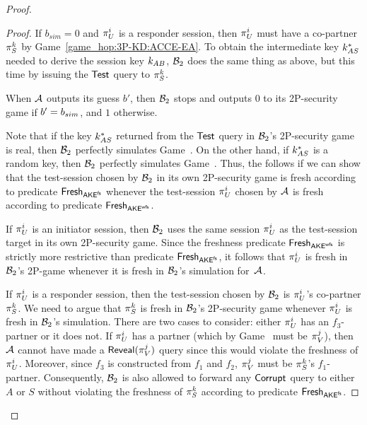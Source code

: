 \begin{proof}
\begin{proof}
If $b_{sim} = 0$ and $\oracle[U][i]$ is a responder session,
then $\oracle[U][i]$ must have a co-partner $\oracle[S][k]$ by Game~\ref{game_hop:3P-KD:ACCE-EA}.
To obtain the intermediate key $\key_{AS}^*$ needed to derive the session key $\key_{AB}$, 
$\A[B]_2$ does the same thing as above,
but this time by issuing the $\Test$ query to $\oracle[S][k]$.



When $\A$ outputs its guess $b'$,
then $\A[B]_2$ stops and outputs $0$ to its 2P-\akefstext security game if $b' = \bsim$,
and $1$ otherwise.
\medskip

Note that if the key $\key_{AS}^*$ returned from the $\Test$ query in $\A[B]_2$'s 2P-\akefstext security game is real, 
then $\A[B]_2$ perfectly simulates Game~\prevgame{}.
On the other hand,
if $\key_{AS}^*$ is a random key,
then $\A[B]_2$ perfectly simulates Game~\game{}.
Thus, the  follows if we can show that the test-session chosen by $\A[B]_2$ in its own 2P-\akefstext security game is fresh according to predicate $\fresh_{\akefs}$ whenever the test-session $\oracle[U][i]$ chosen by $\A$ is fresh according to predicate $\fresh_{\akewfs}$.

If $\oracle[U][i]$ is an initiator session,
then $\A[B]_2$  uses the same session $\oracle[U][i]$ as the test-session target in its own 2P-\akefstext security game.
Since the freshness predicate $\fresh_{\akewfs}$ is strictly more restrictive than predicate $\fresh_{\akefs}$,
it follows that $\oracle[U][i]$ is fresh in $\A[B]_2$'s 2P-\akefstext game whenever it is fresh in $\A[B]_2$'s simulation for~$\A$.

If $\oracle[U][i]$ is a responder session,
then the test-session chosen by $\A[B]_2$ is $\oracle[U][i]$'s co-partner $\oracle[S][k]$.
We need to argue that $\oracle[S][k]$ is fresh in $\A[B]_2$'s 2P-\akefstext security game whenever $\oracle[U][i]$ is \akewfstext fresh in $\A[B]_2$'s simulation.
There are two cases to consider: either $\oracle[U][i]$ has an $f_3$-partner or it does not.
If $\oracle[U][i]$ has a partner
(which by Game~\prevgame{} must be $\oracle[V][j]$), 
then $\A$ cannot have made a $\Reveal(\oracle[V][j])$ query since this would violate the \akewfstext freshness of $\oracle[U][i]$.
Moreover,
since $f_3$ is constructed from $f_1$ and $f_2$,
$\oracle[V][j]$ must be $\oracle[S][k]$'s $f_1$-partner.
Consequently,
$\A[B]_2$ is also allowed to forward any $\Corrupt$ query to either $A$ or $S$ without violating the freshness of $\oracle[S][k]$ according to predicate $\fresh_{\akefs}$.


\end{proof}
\end{proof}
